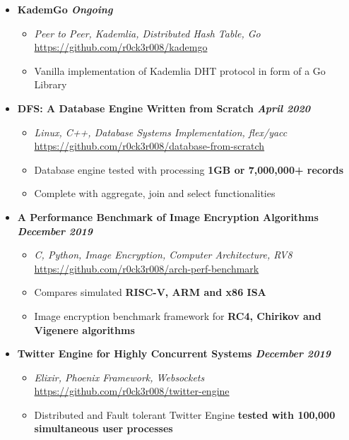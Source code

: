 \documentclass[9]{Resume}
\begin{document}
\begin{itemize}[noitemsep,nolistsep]
	\item[]\textbf{KademGo \hfill \textit{Ongoing}}
		\begin{itemize}[leftmargin=*]
			\setlength\itemsep{-0.25em}
			\item[\textbullet]\textit{Peer to Peer, Kademlia, Distributed Hash Table, Go} \hfill \href{https://github.com/r0ck3r008/kademgo}{{\scriptsize https://github.com/r0ck3r008/kademgo}}
			\item[\textbullet]Vanilla implementation of Kademlia DHT protocol in form of a Go Library
		\end{itemize}

	\item[]\textbf{DFS: A Database Engine Written from Scratch \hfill \textit{April 2020}}
		\begin{itemize}[leftmargin=*]
			\setlength\itemsep{-0.25em}
			\item[\textbullet]\textit{Linux, C++, Database Systems Implementation, flex/yacc} \hfill \href{https://github.com/r0ck3r008/database-from-scratch}{{\scriptsize https://github.com/r0ck3r008/database-from-scratch}}
			\item[\textbullet]Database engine tested with processing \textbf{1GB or 7,000,000+ records}
			\item[\textbullet]Complete with aggregate, join and select functionalities
		\end{itemize}

	\item[]\textbf{A Performance Benchmark of Image Encryption Algorithms \hfill \textit{December 2019}}
		\begin{itemize}[leftmargin=*]
			\setlength\itemsep{-0.25em}
			\item[\textbullet]\textit{C, Python, Image Encryption, Computer Architecture, RV8} \hfill \href{https://github.com/r0ck3r008/arch-perf-benchmark}{{\scriptsize https://github.com/r0ck3r008/arch-perf-benchmark}}
			\item[\textbullet]Compares simulated \textbf{RISC-V, ARM and x86 ISA}
			\item[\textbullet]Image encryption benchmark framework for \textbf{RC4, Chirikov and Vigenere algorithms}
		\end{itemize}

	\item[]\textbf{Twitter Engine for Highly Concurrent Systems \hfill \textit{December 2019}}
		\begin{itemize}[leftmargin=*]
			\setlength\itemsep{-0.25em}
			\item[\textbullet]\textit{Elixir, Phoenix Framework, Websockets} \hfill \href{https://github.com/r0ck3r008/twitter-engine}{{\scriptsize https://github.com/r0ck3r008/twitter-engine}}
			\item[\textbullet]Distributed and Fault tolerant Twitter Engine \textbf{tested with 100,000 simultaneous user processes}
		\end{itemize}


\end{itemize}
\end{document}
